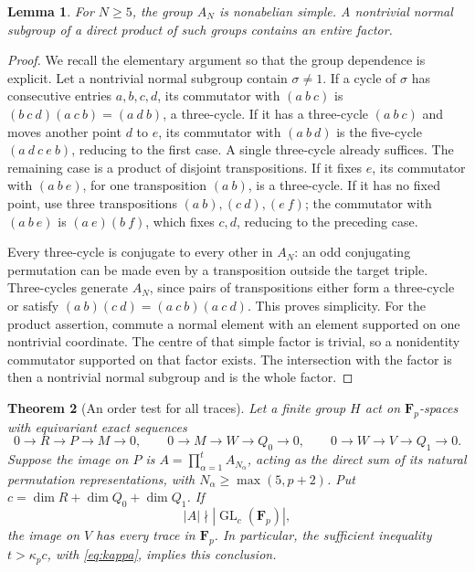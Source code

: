 \documentclass[11pt]{article}
\newtheorem{theorem}{Theorem}[section]
\newtheorem{lemma}[theorem]{Lemma}
\theoremstyle{remark}\newtheorem{remark}[theorem]{Remark}
\newcommand{\FF}{\mathbf F}
\newcommand{\GL}{\operatorname{GL}}
\begin{document}
\begin{lemma}\label{lem:simple}
For $N\ge5$, the group $A_N$ is nonabelian simple. A nontrivial normal subgroup of a direct product of such groups contains an entire factor.
\end{lemma}

\begin{proof}
We recall the elementary argument so that the group dependence is explicit. Let a nontrivial normal subgroup contain $\sigma\ne1$. If a cycle of $\sigma$ has consecutive entries $a,b,c,d$, its commutator with $(a\ b\ c)$ is
$(b\ c\ d)(a\ c\ b)=(a\ d\ b)$, a three-cycle. If it has a three-cycle $(a\ b\ c)$ and moves another point $d$ to $e$, its commutator with $(a\ b\ d)$ is the five-cycle $(a\ d\ c\ e\ b)$, reducing to the first case. A single three-cycle already suffices. The remaining case is a product of disjoint transpositions. If it fixes $e$, its commutator with $(a\ b\ e)$, for one transposition $(a\ b)$, is a three-cycle. If it has no fixed point, use three transpositions $(a\ b),(c\ d),(e\ f)$; the commutator with $(a\ b\ e)$ is $(a\ e)(b\ f)$, which fixes $c,d$, reducing to the preceding case.

Every three-cycle is conjugate to every other in $A_N$: an odd conjugating permutation can be made even by a transposition outside the target triple. Three-cycles generate $A_N$, since pairs of transpositions either form a three-cycle or satisfy
$(a\ b)(c\ d)=(a\ c\ b)(a\ c\ d)$. This proves simplicity. For the product assertion, commute a normal element with an element supported on one nontrivial coordinate. The centre of that simple factor is trivial, so a nonidentity commutator supported on that factor exists. The intersection with the factor is then a nontrivial normal subgroup and is the whole factor.
\end{proof}

\begin{theorem}[An order test for all traces]\label{thm:isolation}
Let a finite group $H$ act on $\FF_p$-spaces with equivariant exact sequences
\begin{equation}\label{eq:three-sequences}
 0\to R\to P\to M\to0,\qquad
 0\to M\to W\to Q_0\to0,\qquad
 0\to W\to V\to Q_1\to0.
\end{equation}
Suppose the image on $P$ is $A=\prod_{\alpha=1}^tA_{N_\alpha}$, acting as the direct sum of its natural permutation representations, with
$N_\alpha\ge\max(5,p+2)$. Put $c=\dim R+\dim Q_0+\dim Q_1$. If
\begin{equation}\label{eq:order-test}
                         |A|\nmid|\GL_c(\FF_p)|,
\end{equation}
the image on $V$ has every trace in $\FF_p$. In particular, the sufficient inequality $t>\kappa_pc$, with \eqref{eq:kappa}, implies this conclusion.
\end{theorem}
\end{document}
